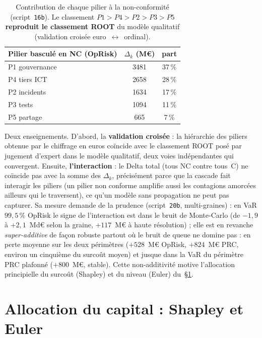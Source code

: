\documentclass[11pt,a4paper]{article}
\begin{document}
\begin{table}[h]\centering\small
\renewcommand{\arraystretch}{1.25}
\begin{tabular}{@{}l cc@{}}
\toprule
Pilier basculé en NC (OpRisk) & $\Delta_k$ (M\euro) & part \\
\midrule
P1 gouvernance   & 3481 & 37\,\% \\
P4 tiers ICT     & 2658 & 28\,\% \\
P2 incidents     & 1634 & 17\,\% \\
P3 tests         & 1094 & 11\,\% \\
P5 partage       & 665  & 7\,\% \\
\bottomrule
\end{tabular}
\caption{Contribution de chaque pilier à la non-conformité (script~\texttt{16b}). Le classement
$P1>P4>P2>P3>P5$ \textbf{reproduit le classement ROOT} du modèle qualitatif (validation
croisée euro~$\leftrightarrow$~ordinal).}
\end{table}

\noindent Deux enseignements. D'abord, la \textbf{validation croisée} : la hiérarchie des
piliers obtenue par le chiffrage en euros coïncide avec le classement ROOT posé par jugement
d'expert dans le modèle qualitatif, deux voies indépendantes qui convergent. Ensuite,
\textbf{l'interaction} : le Delta total (tous NC contre tous~C) ne coïncide pas avec la somme
des $\Delta_k$, précisément parce que la cascade fait interagir les piliers (un pilier non
conforme amplifie aussi les contagions amorcées ailleurs qui le traversent), ce qu'un modèle
sans propagation ne peut pas capturer. Sa mesure demande de la prudence (script~\texttt{20b},
multi-graines) : en VaR $99{,}5\,\%$ OpRisk le signe de l'interaction est dans le bruit de
Monte-Carlo (de $-1{,}9$ à $+2{,}1$~Md\euro{} selon la graine, $+117$~M\euro{} à haute
résolution) ; elle est en revanche \emph{super-additive} de façon robuste partout où le bruit
de queue ne domine pas : en perte moyenne sur les deux périmètres ($+528$~M\euro{} OpRisk,
$+824$~M\euro{} PRC, environ un cinquième du surcoût moyen) et jusque dans la VaR du périmètre
PRC plafonné ($+800$~M\euro, stable). Cette non-additivité motive l'allocation principielle du
surcoût (Shapley) et du niveau (Euler) du~\S\ref{sec:allocation}.

\section{Allocation du capital : Shapley et Euler}
\label{sec:allocation}
\end{document}
